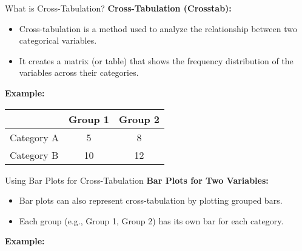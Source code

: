 \documentclass[handout]{beamer} %
\begin{document}
\begin{frame}{What is Cross-Tabulation?}
    \textbf{Cross-Tabulation (Crosstab):}
    \begin{itemize}
        \item Cross-tabulation is a method used to analyze the relationship between two categorical variables.
        \item It creates a matrix (or table) that shows the frequency distribution of the variables across their categories.
    \end{itemize}

    \vspace{0.5cm}
    \textbf{Example:}
    \begin{center}
        \begin{tabular}{lcc}
            \toprule
            & \textbf{Group 1} & \textbf{Group 2} \\
            \midrule
            Category A & 5 & 8 \\
            Category B & 10 & 12 \\
            \bottomrule
        \end{tabular}
    \end{center}
\end{frame}

\begin{frame}{Using Bar Plots for Cross-Tabulation}
    \textbf{Bar Plots for Two Variables:}
    \begin{itemize}
        \item Bar plots can also represent cross-tabulation by plotting grouped bars.
        \item Each group (e.g., Group 1, Group 2) has its own bar for each category.
    \end{itemize}

    \textbf{Example:}
    \begin{center}
    \end{center}

\end{frame}
\end{document}
